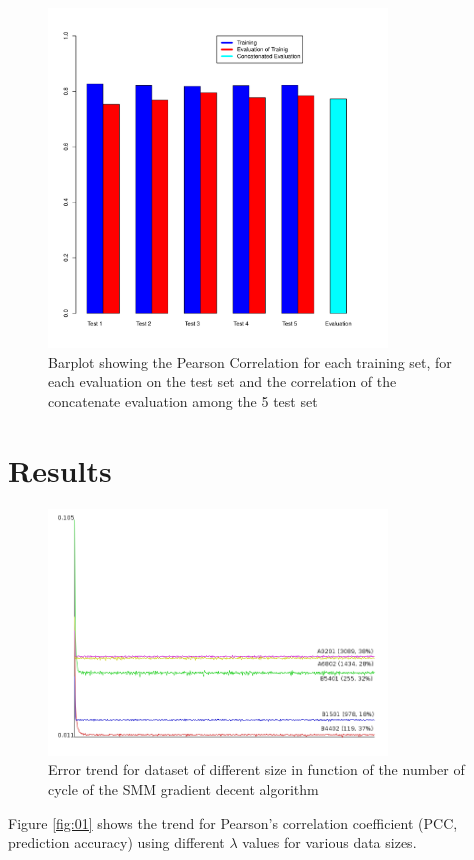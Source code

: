 \documentclass{bioinfo}
\begin{document}
\begin{application}
\begin{figure}[!tpb]
\centerline{\includegraphics[width=9cm]{fig/barplot.pdf}}
\caption{Barplot showing the Pearson Correlation for each training set, for each evaluation on the test set and the correlation of the concatenate evaluation among the 5 test set}
\label{fig:05}
\end{figure}
\section*{Results}

\begin{figure}[!tpb]
\centerline{\includegraphics[width=9cm]{fig/smm_error.png}}
\caption{Error trend for dataset of different size in function of the number of cycle of the SMM gradient decent algorithm}
\label{fig:03}
\end{figure}

Figure \ref{fig:01} shows the trend for Pearson's correlation coefficient (PCC, prediction accuracy) using different $\lambda$ values for various data sizes.





\end{application}
\end{document}
